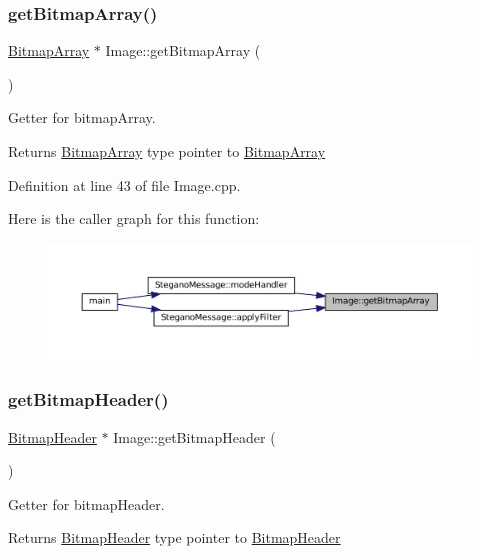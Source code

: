 \subsubsection{\texorpdfstring{getBitmapArray()}{getBitmapArray()}}
{\footnotesize\ttfamily \mbox{\hyperlink{classBitmapArray}{Bitmap\+Array}} $\ast$ Image\+::get\+Bitmap\+Array (\begin{DoxyParamCaption}{ }\end{DoxyParamCaption})}



Getter for bitmap\+Array. 

\begin{DoxyReturn}{Returns}
\mbox{\hyperlink{classBitmapArray}{Bitmap\+Array}} type pointer to \mbox{\hyperlink{classBitmapArray}{Bitmap\+Array}} 
\end{DoxyReturn}


Definition at line 43 of file Image.\+cpp.

Here is the caller graph for this function\+:\nopagebreak
\begin{figure}[H]
\begin{center}
\leavevmode
\includegraphics[width=350pt]{classImage_a75b5051c6cc39a5e3f86d287f5cc7f9c_icgraph}
\end{center}
\end{figure}
\mbox{\label{classImage_a8c824ffac0c866a94752a2c1047932af}} 
\subsubsection{\texorpdfstring{getBitmapHeader()}{getBitmapHeader()}}
{\footnotesize\ttfamily \mbox{\hyperlink{classBitmapHeader}{Bitmap\+Header}} $\ast$ Image\+::get\+Bitmap\+Header (\begin{DoxyParamCaption}{ }\end{DoxyParamCaption})}



Getter for bitmap\+Header. 

\begin{DoxyReturn}{Returns}
\mbox{\hyperlink{classBitmapHeader}{Bitmap\+Header}} type pointer to \mbox{\hyperlink{classBitmapHeader}{Bitmap\+Header}} 
\end{DoxyReturn}


